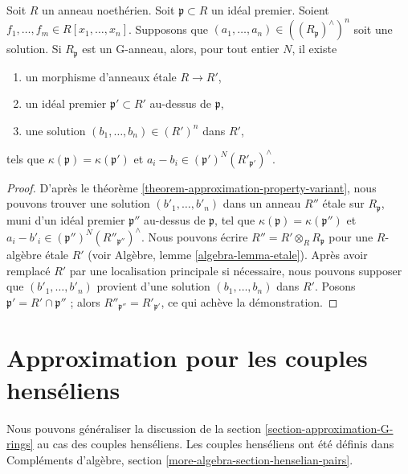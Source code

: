 \begin{lemma}
\label{lemma-approximation-property-variant}
Soit $R$ un anneau noethérien. Soit $\mathfrak p \subset R$ un idéal
premier. Soient
$f_1, \ldots, f_m \in R[x_1, \ldots, x_n]$.
Supposons que $(a_1, \ldots, a_n) \in ((R_\mathfrak p)^\wedge)^n$ soit une
solution. Si $R_\mathfrak p$ est un G-anneau, alors, pour tout entier $N$,
il existe
\begin{enumerate}
\item un morphisme d'anneaux \'etale $R \to R'$,
\item un idéal premier $\mathfrak p' \subset R'$ au-dessus de $\mathfrak p$,
\item une solution $(b_1, \ldots, b_n) \in (R')^n$ dans $R'$,
\end{enumerate}
tels que $\kappa(\mathfrak p) = \kappa(\mathfrak p')$ et
$a_i - b_i \in (\mathfrak p')^N(R'_{\mathfrak p'})^\wedge$.
\end{lemma}

\begin{proof}
D'après le théorème \ref{theorem-approximation-property-variant},
nous pouvons trouver une solution $(b'_1, \ldots, b'_n)$ dans un anneau
$R''$ \'etale sur $R_\mathfrak p$, muni d'un idéal premier
$\mathfrak p''$ au-dessus de $\mathfrak p$, tel que
$\kappa(\mathfrak p) = \kappa(\mathfrak p'')$ et
$a_i - b'_i \in (\mathfrak p'')^N(R''_{\mathfrak p''})^\wedge$.
Nous pouvons écrire
$R'' = R' \otimes_R R_\mathfrak p$
pour une $R$-algèbre \'etale $R'$ (voir Algèbre, lemme
\ref{algebra-lemma-etale}). Après avoir remplacé $R'$ par une localisation
principale si nécessaire, nous pouvons supposer que
$(b'_1, \ldots, b'_n)$ provient d'une solution $(b_1, \ldots, b_n)$
dans $R'$. Posons $\mathfrak p' = R' \cap \mathfrak p''$ ; alors
$R''_{\mathfrak p''} = R'_{\mathfrak p'}$, ce qui achève la démonstration.
\end{proof}



\section{Approximation pour les couples henséliens}
\label{section-approximation-pairs}

\noindent
Nous pouvons généraliser la discussion de la
section \ref{section-approximation-G-rings} au cas des couples henséliens.
Les couples henséliens ont été définis dans
Compléments d'algèbre, section
\ref{more-algebra-section-henselian-pairs}.

